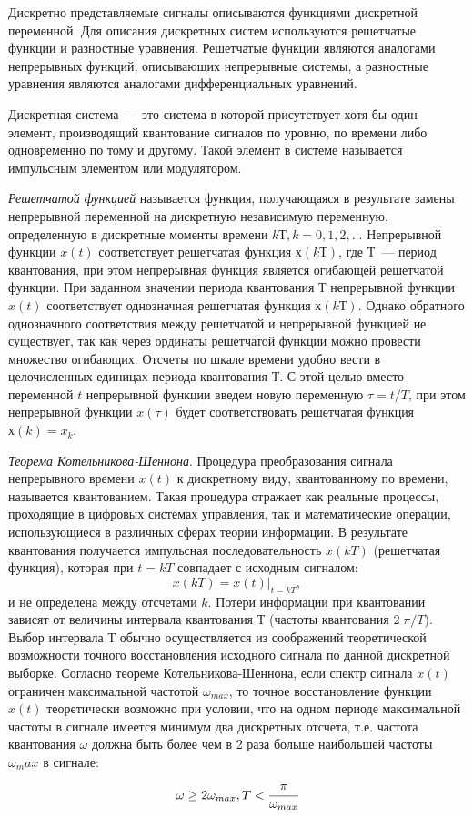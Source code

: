 Дискретно представляемые сигналы описываются функциями дискретной переменной. Для описания дискретных систем используются решетчатые функции и разностные уравнения. Решетчатые функции являются аналогами непрерывных функций, описывающих непрерывные системы, а разностные уравнения являются аналогами дифференциальных уравнений.

Дискретная система~--- это система в которой присутствует хотя бы один элемент, производящий квантование сигналов по уровню, по времени либо одновременно по тому и другому.
Такой элемент в системе называется импульсным элементом или модулятором.

\textit{Решетчатой функцией} называется функция, получающаяся в результате замены непрерывной переменной на дискретную независимую переменную, определенную в дискретные моменты времени $kТ, k = 0, 1, 2, \dots$ Непрерывной функции $x(t)$ соответствует решетчатая функция $х(kТ)$, где $Т$~---  период квантования, при этом непрерывная функция является огибающей решетчатой функции. При заданном значении периода квантования $Т$ непрерывной функции $x(t)$ соответствует однозначная решетчатая функция  $х(kТ)$. Однако обратного однозначного соответствия между решетчатой и непрерывной функцией не существует, так как через ординаты решетчатой функции можно провести множество огибающих.
Отсчеты по шкале времени удобно вести в целочисленных единицах периода квантования $Т$. С этой целью вместо переменной $t$ непрерывной функции введем новую переменную $\tau=t/T$, при этом непрерывной функции $x(\tau)$ будет соответствовать решетчатая функция $х(k) = x_k$.

\textit{Теорема Котельникова-Шеннона}. Процедура преобразования сигнала непрерывного времени $x(t)$ к дискретному виду, квантованному по времени, называется квантованием. Такая процедура отражает как реальные процессы, проходящие в цифровых системах управления, так и математические операции, использующиеся в различных сферах теории информации. В результате квантования получается импульсная последовательность $x(kT)$ (решетчатая функция), которая при $t = kT$ совпадает с исходным сигналом:
\begin{equation}
    x(kT) = x(t)|_{t=kT},
\end{equation}
и не определена между отсчетами $k$. Потери информации при квантовании зависят от величины интервала квантования $Т$ (частоты квантования $2\pi/T$).
Выбор интервала $Т$ обычно осуществляется из соображений теоретической возможности точного восстановления исходного сигнала по данной дискретной выборке. Согласно теореме Котельникова-Шеннона, если спектр сигнала $x(t)$ ограничен максимальной частотой $\omega_{max}$, то точное восстановление функции $x(t)$ теоретически возможно при условии, что на одном периоде максимальной частоты в сигнале имеется минимум два дискретных отсчета, т.е. частота квантования $\omega$ должна быть более чем в 2 раза больше наибольшей частоты $\omega_max$ в сигнале:
\begin{equation}
    \omega \ge 2 \omega_{max}, T < \cfrac{\pi}{\omega_{max}}
\end{equation}

